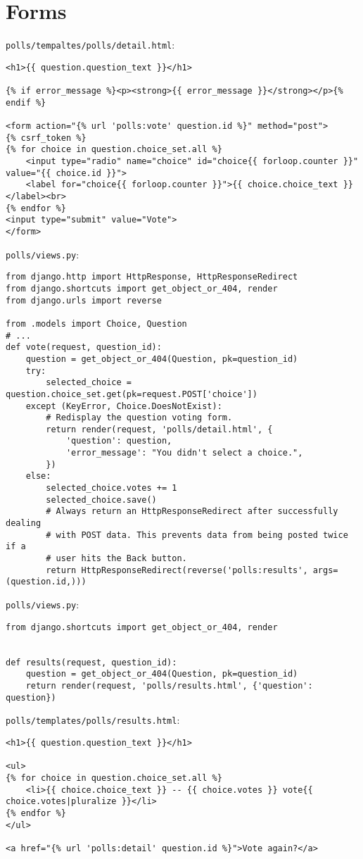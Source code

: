 
\section{Forms}
\verb|polls/tempaltes/polls/detail.html|:
\begin{lstlisting}
<h1>{{ question.question_text }}</h1>

{% if error_message %}<p><strong>{{ error_message }}</strong></p>{% endif %}

<form action="{% url 'polls:vote' question.id %}" method="post">
{% csrf_token %}
{% for choice in question.choice_set.all %}
    <input type="radio" name="choice" id="choice{{ forloop.counter }}" value="{{ choice.id }}">
    <label for="choice{{ forloop.counter }}">{{ choice.choice_text }}</label><br>
{% endfor %}
<input type="submit" value="Vote">
</form>  
\end{lstlisting}



\verb|polls/views.py|:
\begin{lstlisting}
from django.http import HttpResponse, HttpResponseRedirect
from django.shortcuts import get_object_or_404, render
from django.urls import reverse

from .models import Choice, Question
# ...
def vote(request, question_id):
    question = get_object_or_404(Question, pk=question_id)
    try:
        selected_choice = question.choice_set.get(pk=request.POST['choice'])
    except (KeyError, Choice.DoesNotExist):
        # Redisplay the question voting form.
        return render(request, 'polls/detail.html', {
            'question': question,
            'error_message': "You didn't select a choice.",
        })
    else:
        selected_choice.votes += 1
        selected_choice.save()
        # Always return an HttpResponseRedirect after successfully dealing
        # with POST data. This prevents data from being posted twice if a
        # user hits the Back button.
        return HttpResponseRedirect(reverse('polls:results', args=(question.id,)))
      \end{lstlisting}

\verb|polls/views.py|:
\begin{lstlisting}
from django.shortcuts import get_object_or_404, render


def results(request, question_id):
    question = get_object_or_404(Question, pk=question_id)
    return render(request, 'polls/results.html', {'question': question})  
  \end{lstlisting}


\verb|polls/templates/polls/results.html|:
\begin{lstlisting}
<h1>{{ question.question_text }}</h1>

<ul>
{% for choice in question.choice_set.all %}
    <li>{{ choice.choice_text }} -- {{ choice.votes }} vote{{ choice.votes|pluralize }}</li>
{% endfor %}
</ul>

<a href="{% url 'polls:detail' question.id %}">Vote again?</a>
\end{lstlisting}

